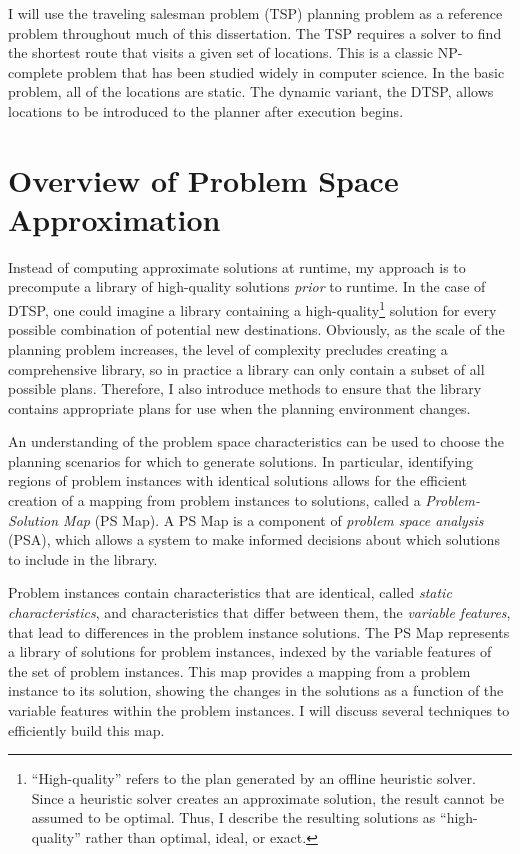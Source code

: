 I will use the traveling salesman problem (TSP) planning problem as a reference problem throughout much of this dissertation.  The TSP requires a solver to find the shortest route that visits a given set of locations.  This is a classic NP-complete problem that has been studied widely in computer science.  In the basic problem, all of the locations are static.  The dynamic variant, the DTSP, allows locations to be introduced to the planner after execution begins.


\section{Overview of Problem Space Approximation}

Instead of computing approximate solutions at runtime, my approach is to precompute a library of high-quality solutions \textit{prior} to runtime.  In the case of DTSP, one could imagine a library containing a high-quality\footnote{``High-quality'' refers to the plan generated by an offline heuristic solver.  Since a heuristic solver creates an approximate solution, the result cannot be assumed to be optimal.  Thus, I describe the resulting solutions as ``high-quality'' rather than optimal, ideal, or exact.} solution for every possible combination of potential new destinations.  Obviously, as the scale of the planning problem increases, the level of complexity precludes creating a comprehensive library, so in practice a library can only contain a subset of all possible plans. Therefore, I also introduce methods to ensure that the library contains appropriate plans for use when the planning environment changes.

An understanding of the problem space characteristics can be used to choose the planning scenarios for which to generate solutions.  In particular, identifying regions of problem instances with identical solutions allows for the efficient creation of a mapping from problem instances to solutions, called a \textit{Problem-Solution Map} (PS Map).  A PS Map is a component of \textit{problem space analysis} (PSA), which allows a system to make informed decisions about which solutions to include in the library.

Problem instances contain characteristics that are identical, called \textit{static characteristics}, and characteristics that differ between them, the \textit{variable features}, that lead to differences in the problem instance solutions.  The PS Map represents a library of solutions for problem instances, indexed by the variable features of the set of problem instances.  This map provides a mapping from a problem instance to its solution, showing the changes in the solutions as a function of the variable features within the problem instances.  I will discuss several techniques to efficiently build this map.

